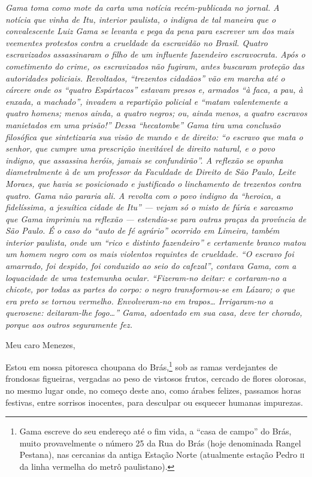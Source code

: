 \begin{resumo}
\emph{Gama toma como mote da carta uma notícia recém-publicada no
jornal. A notícia que vinha de Itu, interior paulista, o indigna de tal
maneira que o convalescente Luiz Gama se levanta e pega da pena para
escrever um dos mais veementes protestos contra a crueldade da
escravidão no Brasil. Quatro escravizados assassinaram o filho de um
influente fazendeiro escravocrata. Após o cometimento do crime, os
escravizados não fugiram, antes buscaram proteção das autoridades
policiais. Revoltados, ``trezentos cidadãos'' vão em marcha até o cárcere
onde os ``quatro Espártacos'' estavam presos e, armados ``à faca, a pau, à
enxada, a machado'', invadem a repartição policial e ``matam valentemente
a quatro homens; menos ainda, a quatro negros; ou, ainda menos, a quatro
escravos manietados em uma prisão!'' Dessa ``hecatombe'' Gama tira uma
conclusão filosófica que sintetizaria sua visão de mundo e de direito:
``o escravo que mata o senhor, que cumpre uma prescrição inevitável de
direito natural, e o povo indigno, que assassina heróis, jamais se
confundirão''. A reflexão se opunha diametralmente à de um professor da
Faculdade de Direito de São Paulo, Leite Moraes, que havia se
posicionado e justificado o linchamento de trezentos contra quatro. Gama
não pararia ali. A revolta com o povo indigno da ``heroica, a
fidelíssima, a jesuítica cidade de Itu'' --- vejam só o misto de fúria e
sarcasmo que Gama imprimiu na reflexão --- estendia-se para outras praças
da província de São Paulo. É o caso do ``auto de fé agrário'' ocorrido em
Limeira, também interior paulista, onde um ``rico e distinto fazendeiro''
e certamente branco matou um homem negro com os mais violentos requintes
de crueldade. ``O escravo foi amarrado, foi despido, foi conduzido ao
seio do cafezal'', contava Gama, com a loquacidade de uma testemunha
ocular. ``Fizeram-no deitar: e cortaram-no a chicote, por todas as partes
do corpo: o negro transformou-se em Lázaro; o que era preto se tornou
vermelho. Envolveram-no em trapos\ldots{} Irrigaram-no a querosene:
deitaram-lhe fogo\ldots{}'' Gama, adoentado em sua casa, deve ter chorado,
porque aos outros seguramente fez. }
\end{resumo}

Meu caro Menezes,

Estou em nossa pitoresca choupana do Brás,\footnote{Gama escreve do
  seu endereço até o fim vida, a ``casa de campo'' do Brás, muito
  provavelmente o número 25 da Rua do Brás (hoje denominada Rangel
  Pestana), nas cercanias da antiga Estação Norte (atualmente estação
  Pedro \textsc{ii} da linha vermelha do metrô paulistano).} sob as ramas
verdejantes de frondosas figueiras, vergadas ao peso de vistosos frutos,
cercado de flores olorosas, no mesmo lugar onde, no começo deste ano,
como árabes felizes, passamos horas festivas, entre sorrisos inocentes,
para desculpar ou esquecer humanas impurezas.

